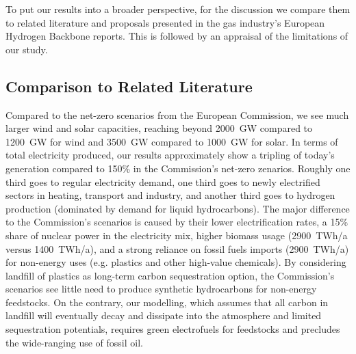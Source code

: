 To put our results into a broader perspective, for the discussion we compare
them to related literature and proposals presented in the gas industry's
European Hydrogen Backbone reports. This is followed by an appraisal of the
limitations of our study.

\subsection*{Comparison to Related Literature}

Compared to the net-zero scenarios from the European
Commission,\cite{in-depth_2018} we see much larger wind and solar capacities,
reaching beyond 2000~GW compared to 1200~GW for wind and 3500~GW compared to
1000~GW for solar.\cite{in-depth_2018} In terms of total electricity produced,
our results approximately show a tripling of today's generation compared to
150\% in the Commission's net-zero zenarios.\cite{in-depth_2018} Roughly one
third goes to regular electricity demand, one third goes to newly electrified
sectors in heating, transport and industry, and another third goes to hydrogen
production (dominated by demand for liquid hydrocarbons). The major difference
to the Commission's scenarios\cite{in-depth_2018} is caused by their lower
electrification rates, a 15\% share of nuclear power in the electricity mix,
higher biomass usage (2900~TWh/a versus 1400~TWh/a), and a strong reliance on
fossil fuels imports (2900~TWh/a) for non-energy uses (e.g. plastics and other
high-value chemicals). By considering landfill of plastics as long-term carbon
sequestration option, the Commission's scenarios see little need to produce
synthetic hydrocarbons for non-energy feedstocks. On the contrary, our
modelling, which assumes that all carbon in landfill will eventually decay and
dissipate into the atmosphere and limited sequestration potentials, requires
green electrofuels for feedstocks and precludes the wide-ranging use of fossil oil.


